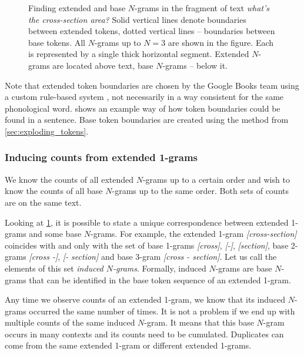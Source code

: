 \documentclass[draft]{IIBproject}
\DeclareRobustCommand{\ngram}[1]{\emph{[#1]}}
\begin{document}
\begin{figure}[h]
\caption{\label{fig:extended_and_base_ngrams}Finding extended and base $N$-grams in the fragment of text \emph{what's the \mbox{cross-section} area?} Solid vertical lines denote boundaries between extended tokens, dotted vertical lines -- boundaries between base tokens. All $N$-grams up to $N=3$ are shown in the figure. Each is represented by a single thick horizontal segment. Extended $N$-grams are located above text, base $N$-grams -- below it.}
\end{figure}

Note that extended token boundaries are chosen by the Google Books team using a custom rule-based system \cite{lin2012thesis}, not necessarily in a way consistent for the same phonological word.  shows an example way of how token boundaries could be found in a sentence. Base token boundaries are created using the method from \cref{sec:exploding_tokens}.

\subsubsection{Inducing counts from extended 1-grams}

We know the counts of all extended $N$-grams up to a certain order and wish to know the counts of all base $N$-grams up to the same order. Both sets of counts are on the same text.

Looking at \cref{fig:extended_and_base_ngrams}, it is possible to state a unique correspondence between extended 1-grams and some base $N$-grams. For example, the extended 1-gram \ngram{\mbox{cross-section}} coincides with and only with the set of base 1-grams \ngram{cross}, \ngram{-}, \ngram{section}, base 2-grams \ngram{cross -}, \ngram{- section} and base 3-gram \ngram{cross - section}. Let us call the elements of this set \emph{induced $N$-grams}. Formally, induced $N$-grams are base $N$-grams that can be identified in the base token sequence of an extended 1-gram.

Any time we observe counts of an extended 1-gram, we know that its induced $N$-grams occurred the same number of times. It is not a problem if we end up with multiple counts of the same induced $N$-gram. It means that this base $N$-gram occurs in many contexts and its counts need to be cumulated. Duplicates can come from the same extended 1-gram or different extended 1-grams.
\end{document}
